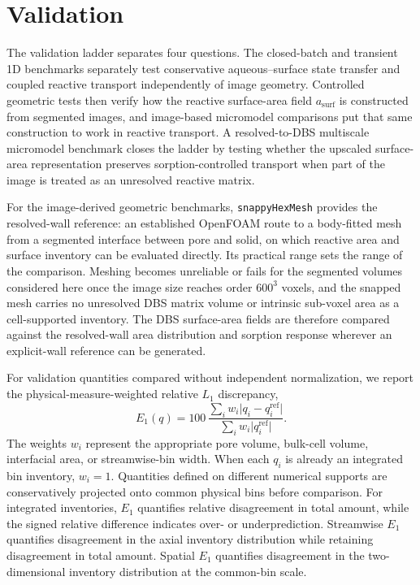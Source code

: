 \section{Validation}\label{sec:validation}

The validation ladder separates four questions. The closed-batch and transient
1D benchmarks separately test conservative aqueous--surface state transfer and
coupled reactive transport independently of image geometry. Controlled
geometric tests then verify how the reactive surface-area field
$a_{\mathrm{surf}}$ is constructed from segmented images, and image-based
micromodel comparisons put that same construction to work in reactive
transport. A resolved-to-DBS multiscale micromodel benchmark closes the ladder
by testing whether the upscaled surface-area representation preserves
sorption-controlled transport when part of the image is treated as an
unresolved reactive matrix.

For the image-derived geometric benchmarks, \texttt{snappyHexMesh} provides the
resolved-wall reference: an established OpenFOAM route to a body-fitted mesh
from a segmented interface between pore and solid, on which reactive area and
surface inventory can be evaluated directly. Its practical range sets the range
of the comparison. Meshing becomes unreliable or fails for the segmented
volumes considered here once the image size reaches order $600^3$ voxels, and
the snapped mesh carries no unresolved DBS matrix volume or intrinsic sub-voxel
area as a cell-supported inventory. The DBS surface-area fields are therefore
compared against the resolved-wall area distribution and sorption response
wherever an explicit-wall reference can be generated.

For validation quantities compared without independent normalization, we
report the physical-measure-weighted relative $L_1$ discrepancy,
\begin{equation}
    E_1(q) = 100\,
    \frac{\sum_i w_i\lvert q_i-q_i^{\mathrm{ref}}\rvert}
         {\sum_i w_i\lvert q_i^{\mathrm{ref}}\rvert}.
    \label{eq:relativeL1}
\end{equation}
The weights $w_i$ represent the appropriate pore volume, bulk-cell volume,
interfacial area, or streamwise-bin width. When each $q_i$ is already an
integrated bin inventory, $w_i=1$. Quantities defined on different numerical
supports are conservatively projected onto common physical bins before
comparison.
For integrated inventories, $E_1$ quantifies relative disagreement in total
amount, while the signed relative difference indicates over- or
underprediction. Streamwise $E_1$ quantifies disagreement in the axial
inventory distribution while retaining disagreement in total amount. Spatial
$E_1$ quantifies disagreement in the two-dimensional inventory distribution at
the common-bin scale.

